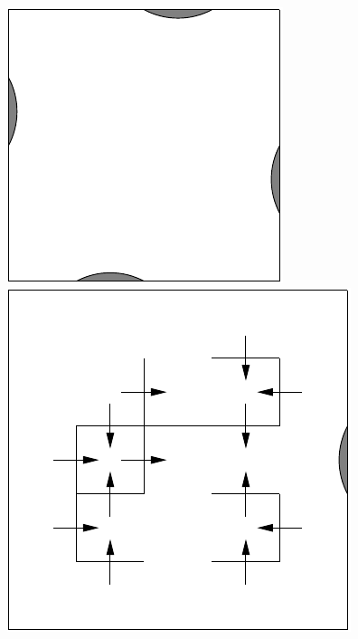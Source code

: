 \documentclass[12pt]{thesis}
\begin{document}
\begin{figure}
	\begin{center}
	\includegraphics[scale=0.75]{"images/4-TV.pdf"}
	\includegraphics[scale=0.75]{"images/1-TV.pdf"}

\end{center}
\end{figure}
\end{document}
